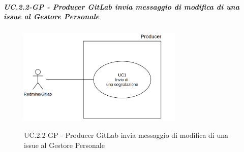 			\subparagraph{UC\theuccount.2.2-GP - Producer GitLab invia messaggio di modifica di una issue al Gestore Personale}
				\begin{figure}[H]
					\centering
					\includegraphics[width=0.7\textwidth]{img/UC1.png}\\
					\caption{UC\theuccount.2.2-GP - Producer GitLab invia messaggio di modifica di una issue al Gestore Personale}
				\end{figure}
